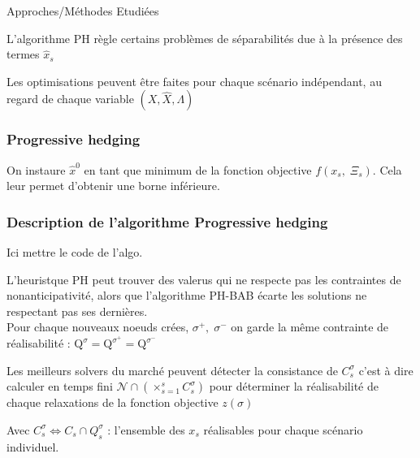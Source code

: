 \documentclass[10pt]{beamer}
\begin{document}
\begin{section}{Approches/Méthodes Etudiées}
    \begin{frame}
        L'algorithme PH règle certains problèmes de séparabilités due à la présence des termes $\hat{x}_s$
    \end{frame}
    
    \begin{frame}
        Les optimisations peuvent être faites pour chaque scénario indépendant, au regard de chaque variable $(X, \hat{X}, \Lambda)$
    \end{frame}
    
    
    
    \begin{frame}
        \frametitle{Progressive hedging}
        On instaure $\hat{x}^0$ en tant que minimum de la fonction objective $f(x_s, \; \Xi_s)$. Cela leur permet d'obtenir une borne inférieure.
        
    \end{frame}
    
    \begin{frame}
        \frametitle{Description de l'algorithme Progressive hedging}
         Ici mettre le code de l'algo.
        
        
    \end{frame}
    
    \begin{frame}
       L'heuristque PH peut trouver des valerus qui ne respecte pas les contraintes de nonanticipativité, alors que l'algorithme PH-BAB écarte les solutions ne respectant pas ses dernières.\\
       Pour chaque nouveaux noeuds crées, $\sigma^+,\;\sigma^-$ on garde la même contrainte de réalisabilité : $\mathrm{Q}^\sigma = \mathrm{Q}^{\sigma^+} = \mathrm{Q}^{\sigma^-}$
    \end{frame}
    
    \begin{frame}
      Les meilleurs solvers du marché peuvent détecter la consistance de $C_s^\sigma$ c'est à dire calculer en temps fini 
      $\mathcal{N}\cap(\times_{s = 1}^s C_s^\sigma)$ pour déterminer la réalisabilité de chaque relaxations de la fonction objective $z(\sigma)$
      
      Avec $C_s^\sigma \Leftrightarrow C_s \cap Q_s^\sigma$ : l'ensemble des $x_s$ réalisables pour chaque scénario individuel.
    \end{frame}
    \end{section}
    
\end{document}
